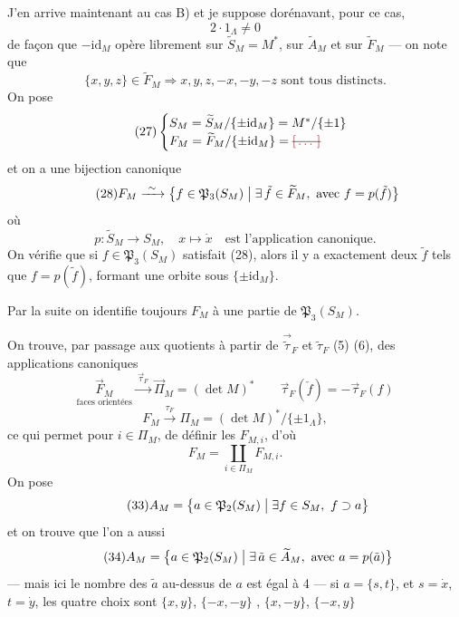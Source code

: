 \documentclass[11pt,a4paper]{article}
\begin{document}
J'en arrive maintenant au cas B) et je suppose dorénavant, pour ce cas,
\[
\tag{25}
\boxed{\,2\cdot 1_\Lambda \neq 0\,}
\]
de façon que  $-\mathrm{id}_M$ opère librement sur
$\widetilde{S}_M = M^{*}$, sur $\widetilde{A}_M$ et sur $\widetilde{F}_M$ — on note
  que
\[
\tag{26}
\{x,y,z\}\in\widetilde{F}_M \Longrightarrow x,y,z,-x,-y,-z \text{ sont tous distincts}.
\]
On pose
\[
\tag{27}
\begin{cases}
S_M = \widetilde{S}_M/\{\pm\mathrm{id}_M\} = M^{*}/\{\pm1\}\\
F_M = \widetilde{F}_M/\{\pm\mathrm{id}_M\} = \text{\struck{\ill{}}}
\end{cases}
\]
et on a une bijection canonique
\[
\tag{28}
F_M \xrightarrow{\ \sim\ } \bigl\{ f\in\mathfrak{P}_3(S_M) \bigm| \exists\, \tilde f\in\widetilde{F}_M,\ \text{avec } f = p(\tilde f)\bigr\}
\]
où
\[
\tag{29}
p\colon \widetilde{S}_M \to S_M,\quad x\longmapsto \dot x \quad\text{est l'application canonique.}
\]
On vérifie  que si $f\in\mathfrak{P}_3(S_M)$ satisfait (28), alors il y a
exactement deux $\tilde f$ tels que $f = p(\tilde f)$, formant une orbite sous
$\{\pm\mathrm{id}_M\}$.

Par la suite on identifie toujours $F_M$ à une partie de $\mathfrak{P}_3(S_M)$.

On trouve, par passage aux quotients à partir  de
$\vec{\widetilde{\tau}}_F$  et $\widetilde{\tau}_F$ (5) (6),
des applications canoniques
\[
\tag{30}
\underset{\text{faces orientées}}{\vec{F}_M} \xrightarrow{\ \vec{\tau}_F\ } \vec{\Pi}_M = (\det M)^{*}
\qquad \vec{\tau}_F(\check{f}) = -\vec{\tau}_F(f)
\]
\[
\tag{31}
F_M \xrightarrow{\ \tau_F\ } \Pi_M = (\det M)^{*}/\{\pm 1_\Lambda\},
\]
ce qui permet pour $i\in\Pi_M$, de définir les $F_{M,i}$, d'où
\[
\tag{32}
F_M = \coprod_{i\in\Pi_M} F_{M,i}.
\]
On pose
\[
\tag{33}
A_M = \bigl\{ a\in\mathfrak{P}_2(S_M) \bigm| \exists f\in S_M,\ f\supset a \bigr\}
\]
et on trouve que l'on a aussi
\[
\tag{34}
A_M = \bigl\{ a\in\mathfrak{P}_2(S_M) \bigm| \exists\, \tilde a\in\widetilde{A}_M,\ \text{avec } a = p(\tilde a)\bigr\}
\]
— mais ici le nombre des $\tilde a$  au-dessus de $a$ est égal à 4
— si $a=\{s,t\}$, et $s=\dot x$, $t=\dot y$, les quatre choix sont
$\{x,y\}$, $\{-x,-y\}$ \struck{\ill{}}, $\{x,-y\}$, $\{-x,y\}$
\end{document}
